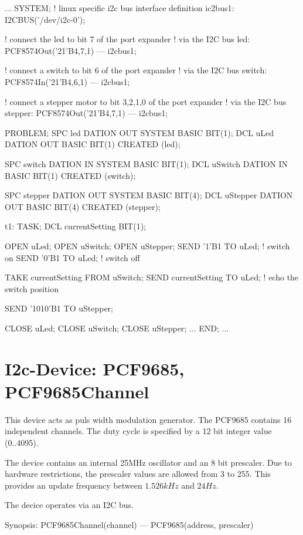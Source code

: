 \begin{PEARLCode}
...
SYSTEM;
   ! linux specific i2c bus interface definition
   ic2bus1: I2CBUS('/dev/i2c-0');

   ! connect the led to bit 7 of the port expander
   ! via the I2C bus
   led: PCF8574Out('21'B4,7,1) --- i2cbus1;

   ! connect a switch to bit 6 of the port expander
   ! via the I2C bus
   switch: PCF8574In('21'B4,6,1) --- i2cbus1;

   ! connect a stepper motor to bit 3,2,1,0 of the port expander
   ! via the I2C bus
   stepper: PCF8574Out('21'B4,7,1) --- i2cbus1;

PROBLEM;
   SPC led DATION OUT SYSTEM BASIC BIT(1);
   DCL uLed DATION OUT BASIC BIT(1) CREATED (led);

   SPC switch DATION IN SYSTEM BASIC BIT(1);
   DCL uSwitch DATION IN BASIC BIT(1) CREATED (switch);

   SPC stepper DATION OUT SYSTEM BASIC BIT(4);
   DCL uStepper DATION OUT BASIC BIT(4) CREATED (stepper);

t1: TASK;
   DCL currentSetting BIT(1);

   OPEN uLed;
   OPEN uSwitch;
   OPEN uStepper;
   SEND '1'B1 TO uLed;  ! switch on
   SEND '0'B1 TO uLed;  ! switch off

   TAKE currentSetting FROM uSwitch;
   SEND currentSetting TO uLed;  ! echo the switch position

   SEND '1010'B1 TO uStepper;
 
   CLOSE uLed;
   CLOSE uSwitch;
   CLOSE uStepper;
...
END;
...
\end{PEARLCode}

\section{I2c-Device: PCF9685, PCF9685Channel}
This device acts as puls width modulation generator.
The PCF9685 contains 16 independent channels. The duty cycle
is specified by a 12 bit integer value (0..4095).

The device contains an internal 25MHz oscillator and an 8 bit
prescaler. Due to hardware restrictions, the prescaler values are
allowed from 3 to 255. This provides an update frequency between
$1.526 kHz$ and $24 Hz$.

The decice operates via an I2C bus. 

Synopsis: PCF9685Channel(channel) --- PCF9685(address, prescaler) \\

